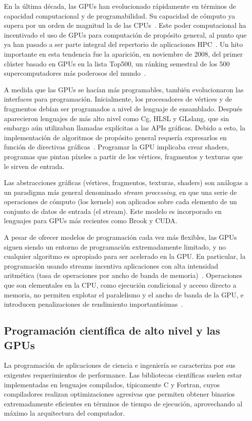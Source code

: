 \documentclass[11pt,spanish]{article}
\begin{document}
En la última década, las GPUs han evolucionado rápidamente en términos de
capacidad computacional y de programabilidad.  Su capacidad de cómputo ya supera
por un orden de magnitud la de las CPUs~\cite{gpupp}.  Este poder computacional ha
incentivado el uso de GPUs para computación de propósito general, al punto que
ya han pasado a ser parte integral del repertorio de aplicaciones
HPC~\cite{gpu-computing}.
Un hito importante en esta tendencia fue la aparición, en noviembre de 2008, del
primer clúster basado en GPUs en la lista Top500, un ránking semestral de los
500 supercomputadores más poderosos del mundo~\cite{top500}.

A medida que las GPUs se hacían más programables, también evolucionaron las
interfaces para programación.  Inicialmente, los procesadores de
vértices y de fragmentos debían ser programados a nivel de lenguaje de
ensamblado.
Después aparecieron lenguajes de más alto nivel como Cg, HLSL y GLslang,
que sin embargo aún utilizaban llamadas explícitas a las APIs gráficas.
Debido a esto, la implementación de algoritmos de propósito general
requería expresarlos en función de directivas gráficas~\cite[\S2.2]{brookgpu}.
Programar la GPU implicaba crear shaders, programas que pintan píxeles a partir
de los vértices, fragmentos y texturas que le sirven de entrada.

Las abstracciones gráficas (vértices, fragmentos, texturas, shaders)
son análogas a un paradigma más general denominado \emph{stream processing},
en que una serie de operaciones de cómputo (los kernels) son aplicados sobre
cada elemento de un conjunto de datos de entrada (el stream).  Este modelo es
incorporado en lenguajes para GPUs más recientes como Brook y CUDA.

A pesar de ofrecer modelos de programación cada vez más flexibles,
las GPUs siguen siendo un entorno de programación extremadamente limitado,
y no cualquier algoritmo es apropiado para ser acelerado en la GPU.
En particular, la programación usando streams
incentiva aplicaciones con alta intensidad aritmética
(tasa de operaciones por ancho de banda de memoria)~\cite[\S2.1]{brookgpu}.
Operaciones que son elementales en la CPU, como
ejecución condicional y acceso directo a memoria, no permiten explotar el
paralelismo y el ancho de banda de la GPU, e introducen penalizaciones de
rendimiento importantísimas~\cite[\S{}V.C]{gpu-computing}.

\subsection{Programación científica de alto nivel y las GPUs}
La programación de aplicaciones de ciencia e ingeniería se caracteriza por sus
exigentes requerimientos de performance.  Las bibliotecas científicas suelen
estar implementadas en lenguajes compilados, típicamente C y Fortran, cuyos
compiladores realizan optimizaciones agresivas que permiten obtener binarios
extremadamente eficientes en términos de tiempo de ejecución, aprovechando al
máximo la arquitectura del computador.
\end{document}
